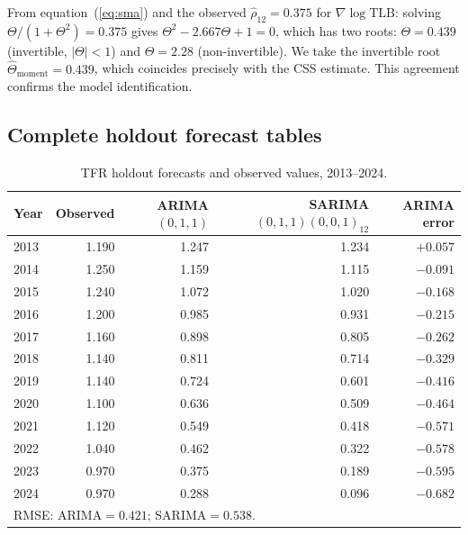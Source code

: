 \documentclass[12pt,a4paper]{article}
\begin{document}
From equation~(\ref{eq:sma}) and the observed $\hat\rho_{12}=0.375$ for
$\nabla\log\text{TLB}$: solving $\Theta/(1+\Theta^2)=0.375$ gives
$\Theta^2 - 2.667\Theta + 1 = 0$, which has two roots:
$\Theta = 0.439$ (invertible, $|\Theta|<1$) and $\Theta = 2.28$ (non-invertible).
We take the invertible root $\hat\Theta_{\text{moment}} = 0.439$, which coincides
precisely with the CSS estimate. This agreement confirms the model identification.

\clearpage
\subsection{Complete holdout forecast tables}

\begin{table}[H]
\centering
\caption{TFR holdout forecasts and observed values, 2013--2024.}
\label{tab:fc_tfr_zy}
\begin{tabular}{lrrrr}
\toprule
Year & Observed & ARIMA$(0,1,1)$ & SARIMA$(0,1,1)(0,0,1)_{12}$ & ARIMA error \\
\midrule
2013 & 1.190 & 1.247 & 1.234 & $+0.057$ \\
2014 & 1.250 & 1.159 & 1.115 & $-0.091$ \\
2015 & 1.240 & 1.072 & 1.020 & $-0.168$ \\
2016 & 1.200 & 0.985 & 0.931 & $-0.215$ \\
2017 & 1.160 & 0.898 & 0.805 & $-0.262$ \\
2018 & 1.140 & 0.811 & 0.714 & $-0.329$ \\
2019 & 1.140 & 0.724 & 0.601 & $-0.416$ \\
2020 & 1.100 & 0.636 & 0.509 & $-0.464$ \\
2021 & 1.120 & 0.549 & 0.418 & $-0.571$ \\
2022 & 1.040 & 0.462 & 0.322 & $-0.578$ \\
2023 & 0.970 & 0.375 & 0.189 & $-0.595$ \\
2024 & 0.970 & 0.288 & 0.096 & $-0.682$ \\
\midrule
\multicolumn{5}{l}{RMSE: ARIMA$=0.421$; SARIMA$=0.538$.}\\
\end{tabular}
\end{table}
\end{document}
